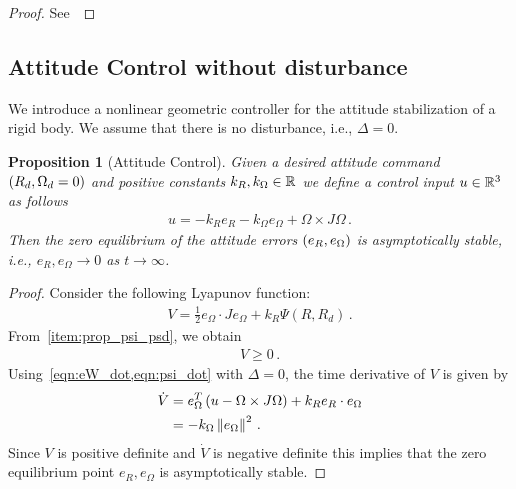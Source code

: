 \documentclass[letterpaper, 10 pt, conference]{ieeeconf}  %
\newtheorem{prop}{Proposition}
\begin{document}
\begin{proof}
	See~
\end{proof}

\subsection{Attitude Control without disturbance}
We introduce a nonlinear geometric controller for the attitude stabilization of a rigid body.
We assume that there is no disturbance, i.e., \( \Delta = 0 \).
\begin{prop}[Attitude Control]\label{prop:att_control}
	Given a desired attitude command \( \left( R_d, \Omega_d = 0 \right) \) and positive constants \( k_R, k_\Omega \in \mathbb{R} \) we define a control input \( u \in \mathbb{R}^3 \) as follows
	\begin{gather}
		u = -k_R e_R - k_\Omega e_\Omega + \Omega \times J \Omega \, . \label{eqn:nodist_control}
	\end{gather}
	Then the zero equilibrium of the attitude errors \( \left( e_R, e_\Omega \right) \) is asymptotically stable, i.e., \(e_R, e_\Omega \to 0 \) as \( t \to \infty \).
\end{prop}

\begin{proof}\label{proof:att_control}
	Consider the following Lyapunov function:
	\begin{gather}
		V = \frac{1}{2} e_\Omega \cdot J e_\Omega + k_R \Psi(R,R_d) \, . \label{eqn:v_nodist}
	\end{gather}
	From~\cref{item:prop_psi_psd}, we obtain
	\begin{gather*}
		V \geq 0 \, .
	\end{gather*}
	Using~\cref{eqn:eW_dot,eqn:psi_dot} with \( \Delta = 0 \), the time derivative of \( V \) is given by
	\begin{align}
		\dot{V} &= e_\Omega^T \left(  u - \Omega \times J \Omega  \right) + k_R e_R \cdot e_\Omega \nonumber \\
		&= -k_\Omega \left\| e_\Omega \right\|^2 \, . \label{eqn:vdot_nodist}
	\end{align}
	Since \( V \) is positive definite and \( \dot{V} \) is negative definite this implies that the zero equilibrium point \( e_R, e_\Omega \) is asymptotically stable.
\end{proof}
\end{document}
